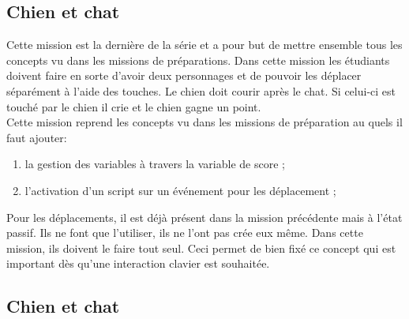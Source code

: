 \subsection{Chien et chat}
Cette mission est la dernière de la série et a pour but de mettre ensemble tous les concepts vu dans les missions de préparations. Dans cette mission les étudiants doivent faire en sorte d'avoir deux personnages et de pouvoir les déplacer séparément à l'aide des touches. Le chien doit courir après le chat. Si celui-ci est touché par le chien il crie et le chien gagne un point.\\

Cette mission reprend les concepts vu dans les missions de préparation au quels il faut ajouter:
\begin{enumerate}
\item la gestion des variables à travers la variable de score ;
\item l'activation d'un script sur un événement pour les déplacement ;
\end{enumerate}

Pour les déplacements, il est déjà présent dans la mission précédente mais à l'état passif. Ils ne font que l'utiliser, ils ne l'ont pas crée eux même. Dans cette mission, ils doivent le faire tout seul. Ceci permet de bien fixé ce concept qui est important dès qu'une interaction clavier est souhaitée.

\subsection{Chien et chat}
